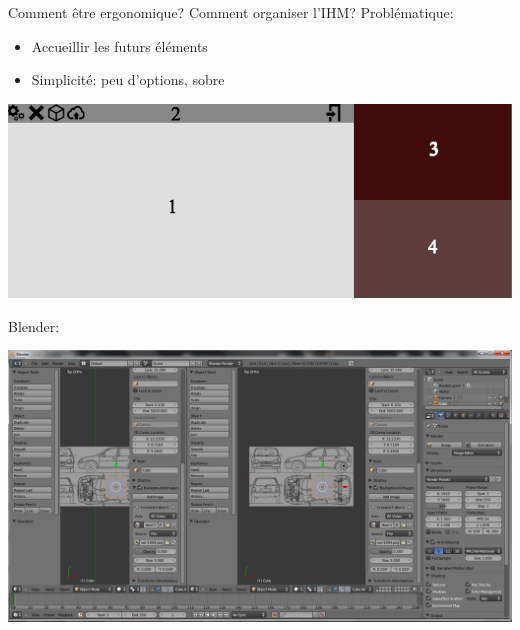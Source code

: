 \documentclass[a4paper,10pt]{beamer}
\begin{document}
		
			
			\begin{frame}{Comment être ergonomique?}
				Comment organiser l'IHM?
				Problématique:
				\begin{itemize}
					\item Accueillir les futurs éléments
					\item Simplicité: peu d'options, sobre
				\end{itemize}

				\centerline{\includegraphics[scale=0.3]{images/Nono/img6.png}}
			Blender:
				\centerline{\includegraphics[scale=0.15]{images/Nono/img5.png}} 
			\end{frame}
		
\end{document}
